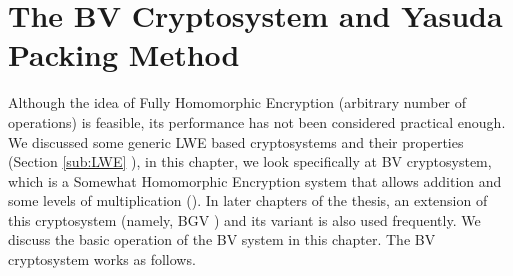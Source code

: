 \section{The BV Cryptosystem and Yasuda Packing Method}
\label{sec:firstProcBGV}
Although the idea of Fully Homomorphic Encryption (arbitrary number of
operations) is feasible, its performance has not been considered practical
enough. We discussed some generic LWE based cryptosystems and their properties
(Section \ref{sub:LWE} ), in this chapter, we look specifically at BV
cryptosystem, which is a Somewhat Homomorphic Encryption system that allows
addition and some levels of multiplication (\cite{brakerski2011fully}). In later
chapters of the thesis, an extension of this cryptosystem (namely, BGV
\cite{brakerski2014leveled}) and its variant is also used frequently. We discuss
the basic operation of the BV system in this chapter.  The BV cryptosystem works
as follows.
